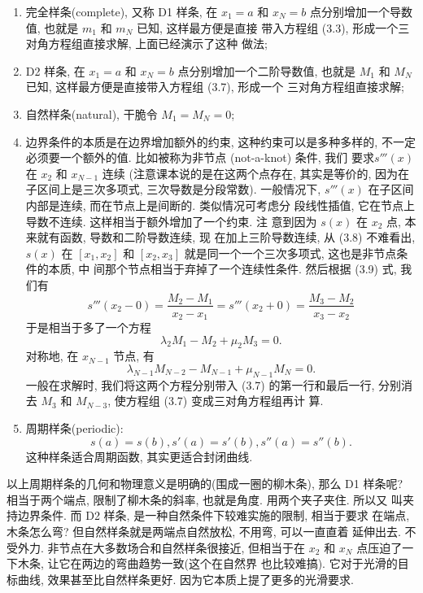 \documentclass[a4paper]{ctexart}
\begin{document}
{\begin{enumerate}
  \item 完全样条(complete), 又称 D1 样条, 在 $x_1 = a$ 和 $x_N = b$
    点分别增加一个导数值, 也就是 $m_1$ 和 $m_N$ 已知, 这样最方便是直接
    带入方程组 (3.3), 形成一个三对角方程组直接求解, 上面已经演示了这种
    做法;%
  \item D2 样条, 在 $x_1 = a$ 和 $x_N = b$ 点分别增加一个二阶导数值,
    也就是 $M_1$ 和 $M_N$ 已知, 这样最方便是直接带入方程组 (3.7), 形成一个
    三对角方程组直接求解;%
  \item 自然样条(natural), 干脆令 $M_1 = M_N = 0$; 
  \item 边界条件的本质是在边界增加额外的约束, 这种约束可以是多种多样的,
    不一定必须要一个额外的值. 比如被称为非节点 (not-a-knot) 条件, 我们
    要求$s'''(x)$ 在 $x_2$ 和 $x_{N - 1}$ 连续 (注意课本说的是在这两个点存在, 
    其实是等价的, 因为在子区间上是三次多项式, 三次导数是分段常数). 
    一般情况下,
    $s'''(x)$ 在子区间内部是连续, 而在节点上是间断的. 类似情况可考虑分
    段线性插值, 它在节点上导数不连续. 这样相当于额外增加了一个约束. 注
    意到因为 $s(x)$ 在 $x_2$ 点, 本来就有函数, 导数和二阶导数连续, 现
    在加上三阶导数连续, 从 (3.8) 不难看出, $s(x)$ 在 $[x_1, x_2]$ 和
    $[x_2, x_3]$ 就是同一个一个三次多项式, 这也是非节点条件的本质, 中
    间那个节点相当于弃掉了一个连续性条件. 然后根据 (3.9) 式, 我们有
    $$
      s'''(x_2 - 0) = \frac{M_2 - M_1}{x_2 - x_1} =
      s'''(x_2 + 0) = \frac{M_3 - M_2}{x_3 - x_2}
    $$
    于是相当于多了一个方程
    $$
    \lambda_2 M_1 - M_2 + \mu_2 M_3 = 0.
    $$
    对称地, 在 $x_{N - 1}$ 节点, 有
    $$
    \lambda_{N - 1} M_{N - 2} - M_{N - 1} + \mu_{N - 1} M_{N} = 0.
    $$
    一般在求解时, 我们将这两个方程分别带入 (3.7) 的第一行和最后一行,
    分别消去 $M_3$ 和 $M_{N - 3}$, 使方程组 (3.7) 变成三对角方程组再计
    算. 
  \item 周期样条(periodic):
    $$
    s(a) = s(b), s'(a) = s'(b), s''(a) = s''(b).
    $$
    这种样条适合周期函数, 其实更适合封闭曲线. 
\end{enumerate}

以上周期样条的几何和物理意义是明确的(围成一圈的柳木条), 那么 D1 样条呢?
相当于两个端点, 限制了柳木条的斜率, 也就是角度. 用两个夹子夹住. 所以又
叫夹持边界条件. 而 D2 样条, 是一种自然条件下较难实施的限制, 相当于要求
在端点, 木条怎么弯? 但自然样条就是两端点自然放松, 不用弯, 可以一直直着
延伸出去. 不受外力. 非节点在大多数场合和自然样条很接近, 但相当于在
$x_2$ 和 $x_N$ 点压迫了一下木条, 让它在两边的弯曲趋势一致(这个在自然界
也比较难搞). 它对于光滑的目标曲线, 效果甚至比自然样条更好. 
因为它本质上提了更多的光滑要求. 

}
\end{document}
